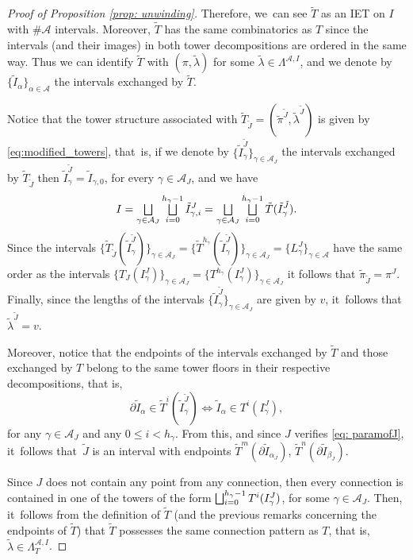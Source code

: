 \documentclass[JEP,XML,SOM,Unicode,NoEqCountersInSection,NoFloatCountersInSection,published]{cedram}
\let\oldbigsqcup\bigsqcup
\renewcommand{\bigsqcup}{\mathop{\textstyle\oldbigsqcup}\displaylimits}
\theoremstyle{plain}
\theoremstyle{definition}
\newcommand{\A}{\mathcal{A}}
\begin{document}
\begin{proof}[Proof of Proposition \ref{prop: unwinding}]
Therefore, we~can see $\tilde T$ as an IET on $I$ with $\# \A$ intervals. Moreover, $\tilde T$ has the same combinatorics as $T$ since the intervals (and their images) in both tower decompositions are ordered in the same way. Thus we can identify $\tilde T$ with $(\pi, \tilde \lambda)$ for some $\tilde \lambda \in \Lambda^{\A, I}$, and we denote by $\{\tilde I_\alpha\}_{\alpha \in \A}$ the intervals exchanged by $\tilde T$.

Notice that the tower structure associated with $\tilde T_{\tilde J} = (\tilde \pi^{\tilde J}, \tilde \lambda^{\tilde J})$ is given by \eqref{eq:modified_towers}, that~is, if we denote by $\{\tilde I_\gamma^{\tilde J}\}_{\gamma \in \A_J}$ the intervals exchanged by $\tilde T_{\tilde J}$ then $ \tilde I_\gamma^{\tilde J} = \tilde I_{\gamma, 0}$, for every $\gamma \in \A_J$, and we have
\[
 I = \bigsqcup_{\gamma \in \A_J} \bigsqcup_{i = 0}^{h_\gamma - 1} \tilde I_{\gamma, i}^J = \bigsqcup_{\gamma \in \A_J} \bigsqcup_{i = 0}^{h_\gamma - 1} \tilde T(\tilde I_{\gamma}^{\tilde J}).
\]
Since the intervals $\{\tilde T_{\tilde J}(\tilde I_\gamma^{\tilde J})\}_{\gamma \in \A_J} = \{\tilde T^{h_\gamma}(\tilde I_\gamma^{\tilde J})\}_{\gamma \in \A_J} = \{L_\gamma^J\}_{\gamma \in \A}$ have the same order as the intervals $\{T_{J}(I_\gamma^J)\}_{\gamma \in \A_J} = \{T^{h_\gamma}(I_\gamma^J)\}_{\gamma \in \A_J}$ it follows that $\tilde \pi_{\tilde J} = \pi^J$. Finally, since the lengths of the intervals $\{\tilde I_\gamma^{\tilde J}\}_{\gamma \in \A_J}$ are given by $v$, it~follows that $\tilde \lambda^{\tilde J} = v$.

Moreover, notice that the endpoints of the intervals exchanged by $\tilde T$ and those exchanged by $T$ belong to the same tower floors in their respective decompositions, that is,
\[
 \partial \tilde I_\alpha \in \tilde{T}^i(\tilde I_\gamma^{\tilde J}) \iff \tilde I_\alpha \in T^i(I^J_\gamma),
\]
for any $\gamma \in \A_J$ and any $0 \leq i < h_\gamma$. From this, and since $J$ verifies \eqref{eq: paramofJ}, it~follows that~$\tilde J$ is an interval with endpoints $\tilde T^{m}(\partial \tilde I_{\alpha_J})$, $\tilde T^n(\partial \tilde I_{\beta_J})$.

Since $J$ does not contain any point from any connection, then every connection is contained in one of the towers of the form $\bigsqcup_{i=0}^{h_{\gamma}-1}T^i(I_{\gamma}^J)$, for some $\gamma \in \A_J$. Then, it~follows from the definition of $\tilde T$ (and the previous remarks concerning the endpoints of $\tilde T$) that $\tilde T$ possesses the same connection pattern as $T$, that is, $\tilde \lambda \in \Lambda_T^{\A, I}$.
\end{proof}
\end{document}
